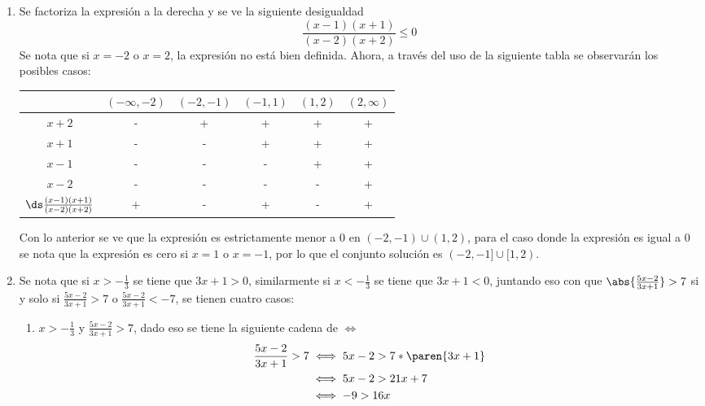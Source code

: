 \documentclass{ayudantia}
\begin{document}
\begin{ans}
    \begin{sol}
        \begin{enumerate}
            \item Se factoriza la expresión a la derecha y se ve la siguiente desigualdad
            \begin{equation*}
                \frac{(x-1)(x+1)}{(x-2)(x+2)}\leq0
            \end{equation*}
            Se nota que si \(x=-2\) o \(x=2\), la expresión no está bien definida. Ahora, a través del uso de la siguiente tabla se observarán los posibles casos:
            \begin{center}
                \begin{tabular}{c|c|c|c|c|c|}
                    &\((-\infty,-2)\)&\((-2,-1)\)&\((-1,1)\)&\((1,2)\)&\((2,\infty)\)\\\hline
                    \(x+2\)&-&+&+&+&+\\
                    \(x+1\)&-&-&+&+&+\\
                    \(x-1\)&-&-&-&+&+\\
                    \(x-2\)&-&-&-&-&+\\
                    \(\ds\frac{(x-1)(x+1)}{(x-2)(x+2)}\)&+&-&+&-&+\\
                \end{tabular}
            \end{center}
            Con lo anterior se ve que la expresión es estrictamente menor a \(0\) en \((-2,-1)\cup(1,2)\), para el caso donde la expresión es igual a \(0\) se nota que la expresión es cero si \(x=1\) o \(x=-1\), por lo que el conjunto solución es \((-2,-1]\cup[1,2)\).
            \item Se nota que si \(x>-\frac13\) se tiene que \(3x+1>0\), similarmente si \(x<-\frac13\) se tiene que \(3x+1<0\), juntando eso con que \(\abs{\frac{5x-2}{3x+1}}>7\) si y solo si \(\frac{5x-2}{3x+1}>7\) o \(\frac{5x-2}{3x+1}<-7\), se tienen cuatro casos:
            \begin{enumerate}[label={Caso \arabic*:}]
                \item \(x>-\frac13\) y \(\frac{5x-2}{3x+1}>7\), dado eso se tiene la siguiente cadena de \(\iff\)
                \begin{align*}
                    \frac{5x-2}{3x+1}>7&\iff 5x-2>7*\paren{3x+1}\\
                    &\iff 5x-2>21x+7\\
                    &\iff -9>16x\\

\end{align*}
\end{enumerate}
\end{enumerate}
\end{sol}
\end{ans}
\end{document}
